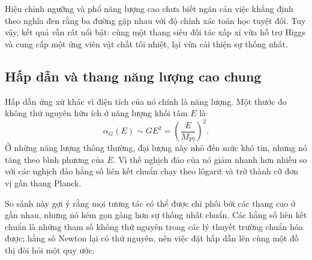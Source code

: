 \begin{classroomqa}
\end{classroomqa}

Hiệu chỉnh ngưỡng và phổ năng lượng cao chưa biết ngăn cản việc khẳng định theo nghĩa đen rằng ba đường gặp nhau với độ chính xác toán học tuyệt đối. Tuy vậy, kết quả vẫn rất nổi bật: cùng một thang siêu đối tác xấp xỉ vừa hỗ trợ Higgs và cung cấp một ứng viên vật chất tối nhiệt, lại vừa cải thiện sự thống nhất.

\subsection{Hấp dẫn và thang năng lượng cao chung}

Hấp dẫn ứng xử khác vì điện tích của nó chính là năng lượng. Một thước đo không thứ nguyên hữu ích ở năng lượng khối tâm \(E\) là
\begin{equation}
\alpha_G(E)\sim GE^2
=\left(\frac{E}{M_{\mathrm{Pl}}}\right)^2.
\end{equation}
Ở những năng lượng thông thường, đại lượng này nhỏ đến mức khó tin, nhưng nó tăng theo bình phương của \(E\). Vì thế nghịch đảo của nó giảm nhanh hơn nhiều so với các nghịch đảo hằng số liên kết chuẩn chạy theo lôgarit và trở thành cỡ đơn vị gần thang Planck.

So sánh này gợi ý rằng mọi tương tác có thể được chi phối bởi các thang cao ở gần nhau, nhưng nó kém gọn gàng hơn sự thống nhất chuẩn. Các hằng số liên kết chuẩn là những tham số không thứ nguyên trong các lý thuyết trường chuẩn hóa được; hằng số Newton lại có thứ nguyên, nên việc đặt hấp dẫn lên cùng một đồ thị đòi hỏi một quy ước.

\begin{classroomqa}
\end{classroomqa}

